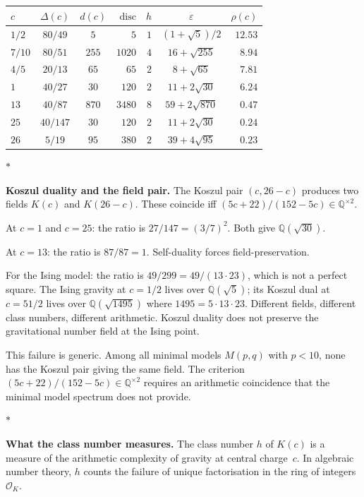 \documentclass[11pt]{article}
\newcommand{\cO}{\mathcal{O}}
\newcommand{\Q}{\mathbb{Q}}
\newcommand{\sep}{\bigskip\begin{center}$*$\end{center}\medskip}
\begin{document}
\begin{center}
\small
\renewcommand{\arraystretch}{1.15}
\begin{tabular}{@{}lccrrcr@{}}
$c$
  & $\Delta(c)$
  & $d(c)$
  & $\mathrm{disc}$
  & $h$
  & $\varepsilon$
  & $\rho(c)$ \\
\hline
$1/2$ & $80/49$ & $5$ & $5$ & $1$
  & $(1{+}\sqrt{5})/2$ & $12.53$ \\[2pt]
$7/10$ & $80/51$ & $255$ & $1020$ & $4$
  & $16{+}\sqrt{255}$ & $8.94$ \\[2pt]
$4/5$ & $20/13$ & $65$ & $65$ & $2$
  & $8{+}\sqrt{65}$ & $7.81$ \\[2pt]
$1$ & $40/27$ & $30$ & $120$ & $2$
  & $11{+}2\sqrt{30}$ & $6.24$ \\[2pt]
$13$ & $40/87$ & $870$ & $3480$ & $8$
  & $59{+}2\sqrt{870}$ & $0.47$ \\[2pt]
$25$ & $40/147$ & $30$ & $120$ & $2$
  & $11{+}2\sqrt{30}$ & $0.24$ \\[2pt]
$26$ & $5/19$ & $95$ & $380$ & $2$
  & $39{+}4\sqrt{95}$ & $0.23$
\end{tabular}
\end{center}

\sep

\noindent\textbf{Koszul duality and the field pair.}\enspace
The Koszul pair $(c, 26-c)$ produces two fields $K(c)$
and $K(26-c)$.  These coincide iff
$(5c+22)/(152-5c) \in \Q^{\times 2}$.

At $c = 1$ and $c = 25$: the ratio is $27/147 = (3/7)^2$.
Both give $\Q(\sqrt{30})$.

At $c = 13$: the ratio is $87/87 = 1$.  Self-duality forces
field-preservation.

For the Ising model: the ratio is $49/299 = 49/(13 \cdot 23)$,
which is not a perfect square.  The Ising gravity at $c = 1/2$
lives over $\Q(\sqrt{5})$; its Koszul dual at $c = 51/2$
lives over $\Q(\sqrt{1495})$ where $1495 = 5 \cdot 13 \cdot 23$.
Different fields, different class numbers, different arithmetic.
Koszul duality does not preserve the gravitational number field
at the Ising point.

This failure is generic.  Among all minimal models $M(p,q)$
with $p < 10$, none has the Koszul pair giving the same field.
The criterion $(5c+22)/(152-5c) \in \Q^{\times 2}$ requires
an arithmetic coincidence that the minimal model spectrum
does not provide.

\sep

\noindent\textbf{What the class number measures.}\enspace
The class number $h$ of $K(c)$ is a measure of the
arithmetic complexity of gravity at central charge~$c$.
In algebraic number theory, $h$ counts the failure of
unique factorisation in the ring of integers $\cO_K$.
\end{document}
